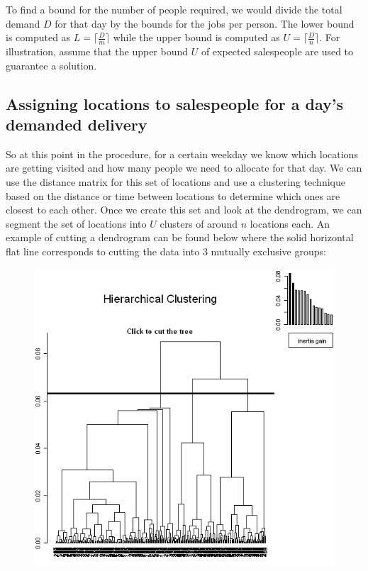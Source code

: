 \documentclass{article}
\begin{document}
To find a bound for the number of people required, we would divide the total demand $D$ for that day by the bounds for the jobs per person.  The lower bound is computed as $L=\lceil\frac{D}{m}\rceil$ while the upper bound is computed as $U=\lceil\frac{D}{n}\rceil$.  For illustration, assume that the upper bound $U$ of expected salespeople are used to guarantee a solution.\\

\subsection{Assigning locations to salespeople for a day's demanded delivery}
So at this point in the procedure, for a certain weekday we know which locations are getting visited and how many people we need to allocate for that day.  We can use the distance matrix for this set of locations and use a clustering technique based on the distance or time between locations to determine which ones are closest to each other.  Once we create this set and look at the dendrogram, we can segment the set of locations into $U$ clusters of around $n$ locations each.  An example of cutting a dendrogram can be found below where the solid horizontal flat line corresponds to cutting the data into 3 mutually exclusive groups: \\

\begin{figure}[H]
	\centering
	\includegraphics[scale=0.50]{hierarchical_clustering_example}
	\label{fig:Hierarchical Clustering Dendrogram Example}
\end{figure}
\end{document}
